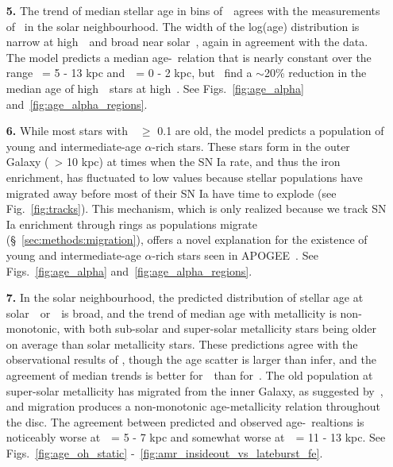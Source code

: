 \documentclass[draft2.tex]{subfiles}
\begin{document}
\begin{enumerate}
	\item[\textbf{5.}] The trend of median stellar age in bins of~\ofe~agrees 
	with the measurements of~\citet{Feuillet2019} in the solar neighbourhood. 
	The width of the log(age) distribution is narrow at high~\ofe~and broad 
	near solar~\ofe, again in agreement with the data. The model predicts a 
	median age-\ofe~relation that is nearly constant over the range 
	\rgal~= 5 - 13 kpc and~\absz~= 0 - 2 kpc, but~\citet{Feuillet2019} find a 
	$\sim$20\% reduction in the median age of high~\ofe~stars at high~\absz. 
	See Figs.~\ref{fig:age_alpha} and~\ref{fig:age_alpha_regions}. 

	\item[\textbf{6.}] While most stars with~\ofe~$\geq$ 0.1 are old, the model 
	predicts a population of young and intermediate-age $\alpha$-rich stars. 
	These stars form in the outer Galaxy (\rgal~> 10 kpc) at times when the SN 
	Ia rate, and thus the iron enrichment, has fluctuated to low values because 
	stellar populations have migrated away before most of their SN Ia have time 
	to explode (see Fig.~\ref{fig:tracks}). 
	This mechanism, which is only realized because we track SN Ia enrichment 
	through rings as populations migrate (\S~\ref{sec:methods:migration}), 
	offers a novel explanation for the existence of young and intermediate-age 
	$\alpha$-rich stars seen in APOGEE~\citep{Chiappini2015, Martig2015, 
	Martig2016, Warfield2021}. 
	See Figs.~\ref{fig:age_alpha} and~\ref{fig:age_alpha_regions}. 

	\item[\textbf{7.}] In the solar neighbourhood, the predicted distribution 
	of stellar age at solar~\feh~or~\oh~is broad, and the trend of median age 
	with metallicity is non-monotonic, with both sub-solar and super-solar 
	metallicity stars being older on average than solar metallicity stars. 
	These predictions agree with the observational results of 
	\citet{Feuillet2019}, though the age scatter is larger than 
	\citet{Feuillet2019} infer, and the agreement of median trends is better 
	for~\oh~than for~\feh. 
	The old population at super-solar metallicity has migrated from the inner 
	Galaxy, as suggested by~\citet{Feuillet2018, Feuillet2019}, and migration 
	produces a non-monotonic age-metallicity relation throughout the disc. 
	The agreement between predicted and observed age-\feh~realtions is 
	noticeably worse at~\rgal~= 5 - 7 kpc and somewhat worse at~\rgal~= 11 - 13 
	kpc. 
	See Figs.~\ref{fig:age_oh_static} -~\ref{fig:amr_insideout_vs_lateburst_fe}. 


\end{enumerate}
\end{document}
